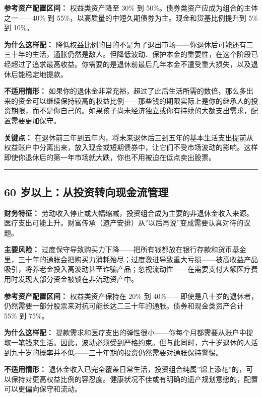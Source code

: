 \documentclass[a4paper,11pt,oneside,fontset=none,UTF8,zihao=-4]{ctexbook}
\begin{document}
\textbf{参考资产配置区间：} 权益类资产降至 30\% 到
50\%。债券类资产应成为组合的主体之一------40\% 到
55\%，以高质量的中短久期债券为主。现金和货基比例提升到 5\% 到 10\%。

\textbf{为什么这样配：}
降低权益比例的目的不是为了退出市场------你退休后可能还有二三十年的生活，通胀仍然是敌人。但降低波动、保护本金的重要性，在这个阶段已经超过了追求最高收益。你需要的是退休前最后几年本金不遭受重大损失，以及退休后能稳定地提款。

\textbf{不适用情形：}
如果你的退休金非常充裕，超过了此后生活所需的数倍，那么多出来的资金可以继续保持较高的权益比例------那些钱的期限实际上是你的继承人的投资期限，而不是你自己的。如果孩子尚未经济独立或你有持续的大额支出需求，配置需要更加保守。

\textbf{关键点：}
在退休前三年到五年内，将未来退休后三到五年的基本生活支出提前从权益账户中分离出来，放入现金或短期债券中，让它们不受市场波动的影响。这样即使你退休后的第一年市场就大跌，你也不用被迫在低点卖出股票。

\begin{center}{\color{dh-bronze}\rule{0.2\textwidth}{0.5pt}}\end{center}

\subsection{60
岁以上：从投资转向现金流管理}\label{ux5c81ux4ee5ux4e0aux4eceux6295ux8d44ux8f6cux5411ux73b0ux91d1ux6d41ux7ba1ux7406}

\textbf{财务特征：}
劳动收入停止或大幅缩减，投资组合成为主要的非退休金收入来源。医疗支出可能上升。财富传承（遗产安排）从''以后再说''变成需要认真对待的议题。

\textbf{主要风险：}
过度保守导致购买力下降------把所有钱都放在银行存款和货币基金里，三十年的通胀会把购买力消耗殆尽；过度激进导致重大亏损------被高收益产品吸引，将养老金投入高波动甚至诈骗产品；忽视流动性------在需要支付大额医疗费用时发现大部分资金被锁在非流动资产中。

\textbf{参考资产配置区间：} 权益类资产保持在 20\% 到
40\%------即使是八十岁的退休者，仍然需要一部分股票来对抗可能长达二三十年的通胀。债券和现金类资产合计
55\% 到 75\%。

\textbf{为什么这样配：}
提款需求和医疗支出的弹性很小------你每个月都需要从账户中提取一笔钱来生活。因此，波动必须受到严格约束。但与此同时，六十岁退休的人活到九十岁的概率并不低------三十年期的投资仍然需要对通胀保持警惕。

\textbf{不适用情形：}
退休金收入已完全覆盖日常生活，投资组合纯属''锦上添花''的，可以保持对更高权益比例的容忍度。健康状况不佳或有明确的遗产规划意愿的，配置可以更偏向保守和流动。
\end{document}

